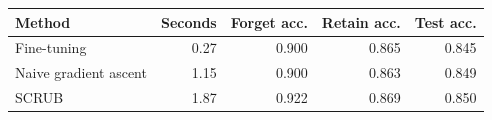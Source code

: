 \begin{tabular}{lrrrr}
\toprule
Method & Seconds & Forget acc. & Retain acc. & Test acc. \\
\midrule
Fine-tuning & 0.27 & 0.900 & 0.865 & 0.845 \\
Naive gradient ascent & 1.15 & 0.900 & 0.863 & 0.849 \\
SCRUB & 1.87 & 0.922 & 0.869 & 0.850 \\
\bottomrule
\end{tabular}
